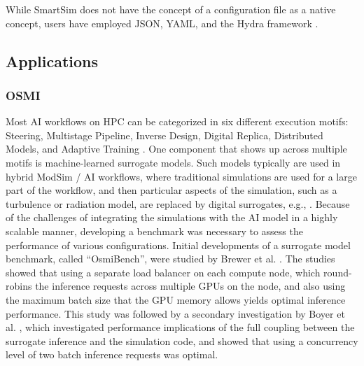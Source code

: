 \documentclass[utf8]{FrontiersinVancouver} %
\begin{document}
While SmartSim does not have the concept of a configuration file as a native concept, users have employed JSON, YAML, and the Hydra framework \cite{Hadan2019Hydra}.

\subsection{Applications}


\subsubsection{OSMI}

Most AI workflows on HPC can be categorized in six different execution motifs: Steering, Multistage Pipeline, Inverse Design, Digital Replica, Distributed Models, and Adaptive Training \cite{brewer2024ai}. One component that shows up across multiple motifs is machine-learned surrogate models. Such models typically are used in hybrid ModSim / AI workflows, where traditional simulations are used for a large part of the workflow, and then particular aspects of the simulation, such as a turbulence or radiation model, are replaced by digital surrogates, e.g., \cite{partee2022using, martinez2022roam, bhushan2023assessment}. Because of the challenges of integrating the simulations with the AI model in a highly scalable manner, developing a benchmark was necessary to assess the performance of various configurations. Initial developments of a surrogate model benchmark, called ``OsmiBench'', were studied by Brewer et al. \cite{brewer2021production}. The studies showed that using a separate load balancer on each compute node, which round-robins the inference requests across multiple GPUs on the node, and also using the maximum batch size that the GPU memory allows yields optimal inference performance. This study was followed by a secondary investigation by Boyer et al. \cite{boyer2022scalable}, which investigated performance implications of the full coupling between the surrogate inference and the simulation code, and showed that using a concurrency level of two batch inference requests was optimal. 
\end{document}
